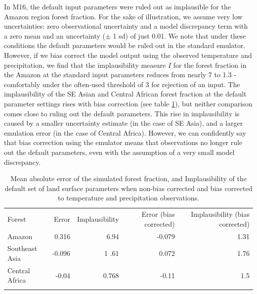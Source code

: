 \documentclass[gmd, manuscript]{copernicus}
\begin{document}
In M16, the default input parameters were ruled out as implausible for the Amazon region forest fraction. For the sake of illustration, we assume very low uncertainties: zero observational uncertainty and a model discrepancy term with a zero mean and an uncertainty ($\pm$ 1 sd) of just 0.01. We note that under these conditions the default parameters would be ruled out in the standard emulator.  However, if we bias correct the model output using the observed temperature and precipitation, we find that the implausibility measure $I$ for the forest fraction in the Amazon at the standard input parameters reduces from nearly 7 to 1.3 - comfortably under the often-used threshold of 3 for rejection of an input. The implausibility of the SE Asian and Central African forest fraction at the default parameter settings rises with bias correction (see table \ref{tab:default_implausibility}), but neither comparison comes close to ruling out the default parameters. This rise in implausibility is caused by a smaller uncertainty estimate (in the case of SE Asia), and a larger emulation error (in the case of Central Africa). However, we can confidently say that bias correction using the emulator means that observations no longer rule out the default parameters, even with the assumption of a very small model discrepancy.


\begin{table}[t]
\caption{Mean absolute error of the simulated forest fraction, and Implausibility of the default set of land surface parameters when non-bias corrected and bias corrected to temperature and precipitation observations.}
\begin{tabular}{lrrrr}
\tophline

Forest                & Error &    Implausibility &  Error (bias corrected) &   Implausibility (bias corrected) \\
\middlehline
Amazon                &       0.316 &         6.94    &    -0.079  &    1.31  \\
Southeast Asia      &      -0.096   &   1       .61 &  0.072      &   1.76\\
Central Africa          & -0.04  &         0.768        & -0.11    & 1.5       \\
\bottomhline
\end{tabular}
\belowtable{} %
\label{tab:default_implausibility}
\end{table}
\end{document}

